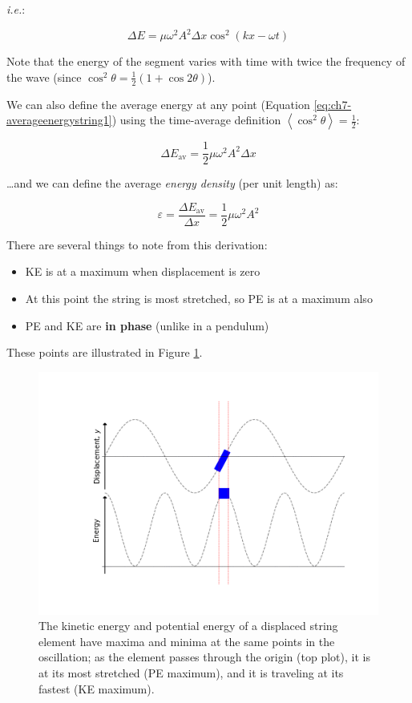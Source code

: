 \documentclass[
]{book}
\providecommand{\tightlist}{%
  \setlength{\itemsep}{0pt}\setlength{\parskip}{0pt}}
\begin{document}
\emph{i.e.}:

\begin{equation}
\Delta E = \mu \omega^2  A^2 \Delta x  \cos^2(kx - \omega t)
\label{eq:ch7-totalenergywavestring1}
\end{equation}

Note that the energy of the segment varies with time with twice the frequency of the wave (since \(\cos^2 \theta = \frac{1}{2}(1+ \cos 2\theta)\)).

We can also define the average energy at any point (Equation \eqref{eq:ch7-averageenergystring1}) using the time-average definition \(\left< \cos^2 \theta \right> = \frac{1}{2}\):

\begin{equation}
\Delta E_{\mathrm{av}} = \frac{1}{2}\mu \omega^2 A^2 \Delta x
\label{eq:ch7-averageenergystring1}
\end{equation}

\ldots and we can define the average \emph{energy density} (per unit length) as:

\begin{equation}
\varepsilon = \frac{\Delta E_{\mathrm{av}}}{\Delta x} = \frac{1}{2} \mu \omega^2 A^2
\end{equation}

There are several things to note from this derivation:

\begin{itemize}
\tightlist
\item
  KE is at a maximum when displacement is zero
\item
  At this point the string is most stretched, so PE is at a maximum also
\item
  PE and KE are \textbf{in phase} (unlike in a pendulum)
\end{itemize}

These points are illustrated in Figure \ref{fig:ch7-kepestringplot1}.

\begin{figure}

{\centering \includegraphics[width=0.7\linewidth]{visualisations/ch7-kepestringplot1} 

}

\caption{The kinetic energy and potential energy of a displaced string element have maxima and minima at the same points in the oscillation; as the element passes through the origin (top plot), it is at its most stretched (PE maximum), and it is traveling at its fastest (KE maximum).}\label{fig:ch7-kepestringplot1}
\end{figure}
\end{document}
